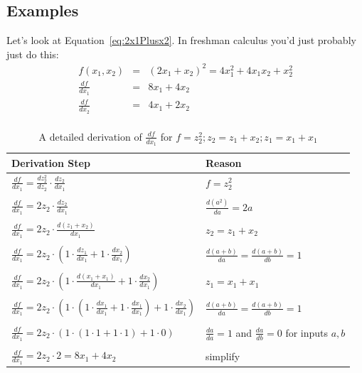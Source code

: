 \documentclass[12pt]{article}
\newcommand{\deriv}[2]{\frac{d{}#1}{d{}#2}}
\begin{document}
\subsection{Examples}

Let's look at Equation~\ref{eq:2x1Plusx2}.  In freshman calculus
you'd just probably just do this: 
\begin{eqnarray*}
f(x_1,x_2) & = & (2 x_1 + x_2)^2 = 4 x_1^2 + 4 x_1 x_2 + x_2^2 \\
\deriv{f}{x_1} & = & 8 x_1 + 4 x_2 \\
\deriv{f}{x_2} & = & 4 x_1 + 2 x_2 \\
\end{eqnarray*}

\begin{table}
\begin{tabular}{l|l}
Derivation Step & Reason \\
\hline
\( \deriv{f}{x_1}  =  \deriv{z_2^2}{z_2} \cdot \deriv{z_2}{x_1} \)
         & $f=z_2^2$ \\
& \\
\( \deriv{f}{x_1}  =  2 z_2 \cdot \deriv{z_2}{x_1} \)
         & $\deriv{(a^2)}{a} = 2a$ \\
& \\
\( \deriv{f}{x_1}  =  2 z_2 \cdot \deriv{(z_1 + x_2)}{x_1} \)
         & $z_2 = z_1 + x_2$ \\
& \\
\( \deriv{f}{x_1}  =  2 z_2 \cdot \left( 1 \cdot \deriv{z_1}{x_1} + 1 \cdot \deriv{x_2}{x_1} \right) \)
         & $\deriv{(a+b)}{a} = \deriv{(a+b)}{b} = 1$ \\
& \\
\( \deriv{f}{x_1}  =  2 z_2 \cdot \left( 1 \cdot \deriv{(x_1 + x_1)}{x_1} + 1 \cdot \deriv{x_2}{x_1} \right) \)
         & $z_1 = x_1 + x_1$ \\
& \\
\( \deriv{f}{x_1}  =  2 z_2 \cdot \left( 1 \cdot \left( 1 \cdot \deriv{x_1}{x_1} + 1 \cdot \deriv{x_1}{x_1} \right) + 1 \cdot \deriv{x_2}{x_1} \right) \)
         & $\deriv{(a+b)}{a} = \deriv{(a+b)}{b} = 1$ \\
& \\
\( \deriv{f}{x_1}  =  2 z_2 \cdot \left( 1 \cdot \left( 1 \cdot 1 + 1 \cdot 1 \right) + 1 \cdot 0 \right) \)
         & $\deriv{a}{a}=1$ and $\deriv{a}{b}=0$ for inputs $a,b$ \\
& \\
\( \deriv{f}{x_1}  =  2 z_2 \cdot 2 = 8 x_1 + 4 x_2 \) 
         & simplify\\
\hline
\end{tabular}
\caption{A detailed derivation of $\deriv{f}{x_1}$ for $f = z_2^2; z_2 = z_1 + x_2; z_1 = x_1 + x_1$}
\label{dx1:2x1Plusx2}
\end{table}
\end{document}
